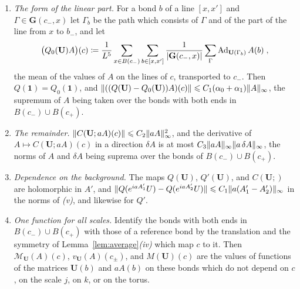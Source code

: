 \documentclass[11pt]{preprint}
\makeatletter
\newcommand{\id}{\mathbf 1}
\newcommand{\Ad}{\operatorname{Ad}}
\DeclarePairedDelimiter{\abs}{\lvert}{\rvert}
\DeclarePairedDelimiter{\norm}{\lVert}{\rVert}
\newcommand*{\bigcdot}{}%
\DeclareRobustCommand*{\bigcdot}{%
	\mathbin{\mathpalette\bigcdot@{}}%
}
\newcommand*{\bigcdot@scalefactor}{.7}
\newcommand*{\bigcdot@widthfactor}{1.15}
\newcommand*{\bigcdot@}[2]{%
	\sbox0{$#1\vcenter{}$}%
	\sbox2{$#1\cdot\m@th$}%
	\hbox to \bigcdot@widthfactor\wd2{%
		\hss
		\raise\ht0\hbox{%
			\scalebox{\bigcdot@scalefactor}{%
				\lower\ht0\hbox{$#1\bullet\m@th$}%
			}%
		}%
		\hss
	}%
}
\numberwithin{equation}{section}
\makeatother
\begin{document}
\begin{proposition}
\begin{enumerate}[label=(\roman*)]
\begin{gather*}
    Q(\mathbf U)D_{\mathbf U}\lambda = D_{M(\mathbf U)}Q'(\mathbf U)\lambda\;,
    \qquad
    \Lambda(\mathbf U)D_{\mathbf U}\lambda = Q'(\mathbf U)\lambda - \lambda|_{T^{(j)}}\;,\\
    Q^{\mathrm{pl}}(\mathbf U)D_{\mathbf U}\lambda = D_{M(\mathbf U)}\bigl(\lambda|_{T^{(j)}}\bigr)\;.
\end{gather*}
\item \emph{The form of the linear part.} For a bond $b$ of a line $[x, x']$ and $\Gamma \in \mathbf G(c_-, x)$ let $\Gamma_b$ be the path which consists of $\Gamma$ and of the part of the line from $x$ to $b_-$, and let
\begin{equation}\label{eq:straight-average}
    \bigl(Q_0(\mathbf U)A\bigr)(c) \coloneqq \frac{1}{L^5}\sum_{x \in B(c_-)}\sum_{b \in [x, x']}\frac{1}{\abs{\mathbf G(c_-, x)}}\sum_{\Gamma}\Ad_{\mathbf U(\Gamma_b)}A(b)\;,
\end{equation}
the mean of the values of $A$ on the lines of $c$, transported to $c_-$. Then $Q(\id) = Q_0(\id)$, and $\norm{((Q(\mathbf U) - Q_0(\mathbf U))A)(c)} \leqslant C_1(\alpha_0 + \alpha_1)\norm A_\infty$, the supremum of $A$ being taken over the bonds with both ends in $B(c_-) \cup B(c_+)$.
\item \emph{The remainder.} $\norm{C(\mathbf U; aA)(c)} \leqslant C_2\norm{aA}_\infty^2$, and the derivative of $A \mapsto C(\mathbf U; aA)(c)$ in a direction $\delta A$ is at most $C_3\norm{aA}_\infty\norm{a\,\delta A}_\infty$, the norms of $A$ and $\delta A$ being suprema over the bonds of $B(c_-) \cup B(c_+)$.
\item \emph{Dependence on the background.} The maps $Q(\mathbf U)$, $Q'(\mathbf U)$, and $C(\mathbf U; \bigcdot)$ are holomorphic in $A'$, and $\norm{Q(e^{iaA'_1}U) - Q(e^{iaA'_2}U)} \leqslant C_1\norm{a(A'_1 - A'_2)}_\infty$ in the norms of \emph{(v)}, and likewise for $Q'$.
\item \emph{One function for all scales.} Identify the bonds with both ends in $B(c_-) \cup B(c_+)$ with those of a reference bond by the translation and the symmetry of Lemma~\ref{lem:average}\emph{(iv)} which map $c$ to it. Then $\mathcal M_{\mathbf U}(A)(c)$, $v_{\mathbf U}(A)(c_\pm)$, and $M(\mathbf U)(c)$ are the values of functions of the matrices $\mathbf U(b)$ and $aA(b)$ on these bonds which do not depend on $c$, on the scale $j$, on $k$, or on the torus.
\end{enumerate}
\end{proposition}
\end{document}

